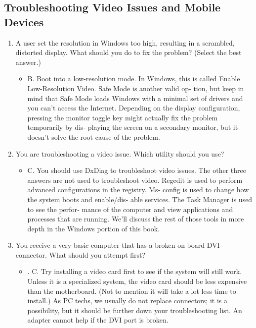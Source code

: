 \documentclass{article}
\begin{document}
\subsection{Troubleshooting
Video Issues and Mobile Devices}
\begin{enumerate}
    \item A user set the resolution in Windows too high, resulting in a
scrambled, distorted display. What should you do to fix the
problem? (Select the best answer.)
    \begin{itemize}
        \item B. Boot into a low-resolution mode. In Windows, this is called
Enable Low-Resolution Video. Safe Mode is another valid op‐
tion, but keep in mind that Safe Mode loads Windows with a
minimal set of drivers and you can’t access the Internet.
Depending on the display configuration, pressing the monitor
toggle key might actually fix the problem temporarily by dis‐
playing the screen on a secondary monitor, but it doesn’t solve the root cause of the problem.
    \end{itemize}
    \item You are troubleshooting a video issue. Which utility should
you use?
    \begin{itemize}
        \item C. You should use DxDiag to troubleshoot video issues. The
other three answers are not used to troubleshoot video. Regedit
is used to perform advanced configurations in the registry. Ms‐
config is used to change how the system boots and enable/dis‐
able services. The Task Manager is used to see the perfor‐
mance of the computer and view applications and processes
that are running. We’ll discuss the rest of those tools in more
depth in the Windows portion of this book.
    \end{itemize}
    \item You receive a very basic computer that has a broken on-board
DVI connector. What should you attempt first?
    \begin{itemize}
        \item . C. Try installing a video card first to see if the system will still
work. Unless it is a specialized system, the video card should
be less expensive than the motherboard. (Not to mention it will
take a lot less time to install.) As PC techs, we usually do not
replace connectors; it is a possibility, but it should be further
down your troubleshooting list. An adapter cannot help if the
DVI port is broken.
    \end{itemize}

\end{enumerate}
\end{document}

